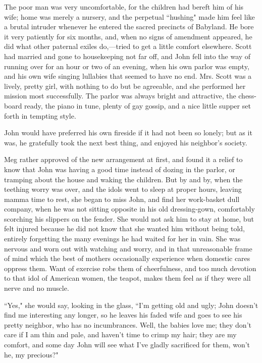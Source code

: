 The poor man was very uncomfortable, for the children had bereft him of
his wife; home was merely a nursery, and the perpetual ``hushing" made
him feel like a brutal intruder whenever he entered the sacred precincts
of Babyland. He bore it very patiently for six months, and, when no
signs of amendment appeared, he did what other paternal exiles
do,---tried to get a little comfort elsewhere. Scott had married and
gone to housekeeping not far off, and John fell into the way of running
over for an hour or two of an evening, when his own parlor was empty,
and his own wife singing lullabies that seemed to have no end. Mrs.
Scott was a lively, pretty girl, with nothing to do but be agreeable,
and she performed her mission most successfully. The parlor was always
bright and attractive, the chess-board ready, the piano in tune, plenty
of gay gossip, and a nice little supper set forth in tempting style.

John would have preferred his own fireside if it had not been so lonely;
but as it was, he gratefully took the next best thing, and enjoyed his
neighbor's society.

Meg rather approved of the new arrangement at first, and found it a
relief to know that John was having a good time instead of dozing in the
parlor, or tramping about the house and waking the children. But by and
by, when the teething worry was over, and the idols went to sleep at
proper hours, leaving mamma time to rest, she began to miss John, and
find her work-basket dull company, when he was not sitting opposite in
his old dressing-gown, comfortably scorching his slippers on the fender.
She would not ask him to stay at home, but felt injured because he did
not know that she wanted him without being told, entirely forgetting the
many evenings he had waited for her in vain. She was nervous and worn
out with watching and worry, and in that unreasonable frame of mind
which the best of mothers occasionally experience when domestic cares
oppress them. Want of exercise robs them of cheerfulness, and too much
devotion to that idol of American women, the teapot, makes them feel as
if they were all nerve and no muscle.

``Yes," she would say, looking in the glass, ``I'm getting
old and ugly; John doesn't find me interesting any
longer, so he leaves his faded wife and goes to see his pretty neighbor,
who has no incumbrances. Well, the babies love me; they
don't care if I am thin and pale, and
haven't time to crimp my hair; they are my comfort, and
some day John will see what I've gladly sacrificed for
them, won't he, my precious?"

